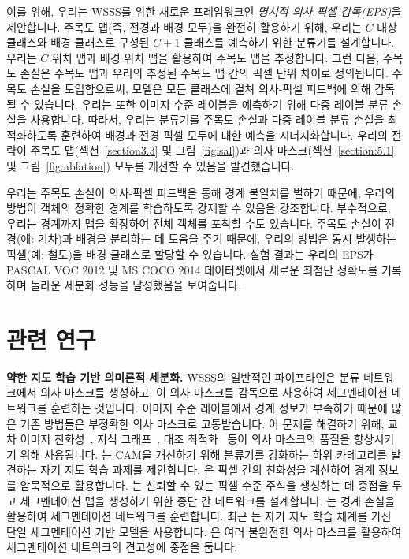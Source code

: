 \documentclass[final]{cvpr}
\begin{document}
이를 위해, 우리는 WSSS를 위한 새로운 프레임워크인 \emph{명시적 의사-픽셀 감독(EPS)}을 제안합니다. 주목도 맵(즉, 전경과 배경 모두)을 완전히 활용하기 위해, 우리는 $C$ 대상 클래스와 배경 클래스로 구성된 $C+1$ 클래스를 예측하기 위한 분류기를 설계합니다. 우리는 $C$ 위치 맵과 배경 위치 맵을 활용하여 주목도 맵을 추정합니다. 그런 다음, 주목도 손실은 주목도 맵과 우리의 추정된 주목도 맵 간의 픽셀 단위 차이로 정의됩니다. 주목도 손실을 도입함으로써, 모델은 모든 클래스에 걸쳐 의사-픽셀 피드백에 의해 감독될 수 있습니다. 우리는 또한 이미지 수준 레이블을 예측하기 위해 다중 레이블 분류 손실을 사용합니다. 따라서, 우리는 분류기를 주목도 손실과 다중 레이블 분류 손실을 최적화하도록 훈련하여 배경과 전경 픽셀 모두에 대한 예측을 시너지화합니다. 우리의 전략이 주목도 맵(섹션~\ref{section3.3} 및 그림~\ref{fig:sal})과 의사 마스크(섹션~\ref{section:5.1} 및 그림~\ref{fig:ablation}) 모두를 개선할 수 있음을 발견했습니다.

우리는 주목도 손실이 의사-픽셀 피드백을 통해 경계 불일치를 벌하기 때문에, 우리의 방법이 객체의 정확한 경계를 학습하도록 강제할 수 있음을 강조합니다. 부수적으로, 우리는 경계까지 맵을 확장하여 전체 객체를 포착할 수도 있습니다. 주목도 손실이 전경(예: 기차)과 배경을 분리하는 데 도움을 주기 때문에, 우리의 방법은 동시 발생하는 픽셀(예: 철도)을 배경 클래스로 할당할 수 있습니다. 실험 결과는 우리의 EPS가 PASCAL VOC 2012 및 MS COCO 2014 데이터셋에서 새로운 최첨단 정확도를 기록하며 놀라운 세분화 성능을 달성했음을 보여줍니다.

\section{관련 연구}

\noindent\textbf{약한 지도 학습 기반 의미론적 세분화.}
WSSS의 일반적인 파이프라인은 분류 네트워크에서 의사 마스크를 생성하고, 이 의사 마스크를 감독으로 사용하여 세그멘테이션 네트워크를 훈련하는 것입니다. 이미지 수준 레이블에서 경계 정보가 부족하기 때문에 많은 기존 방법들은 부정확한 의사 마스크로 고통받습니다. 이 문제를 해결하기 위해, 교차 이미지 친화성~\cite{fan2020cian}, 지식 그래프~\cite{liu2020leveraging}, 대조 최적화~\cite{sun2020mining, zhang2020splitting} 등이 의사 마스크의 품질을 향상시키기 위해 사용됩니다. \cite{chang2020weakly}는 CAM을 개선하기 위해 분류기를 강화하는 하위 카테고리를 발견하는 자기 지도 학습 과제를 제안합니다. \cite{ahn2019weakly, ahn2018learning}은 픽셀 간의 친화성을 계산하여 경계 정보를 암묵적으로 활용합니다. \cite{zhang2020reliability}는 신뢰할 수 있는 픽셀 수준 주석을 생성하는 데 중점을 두고 세그멘테이션 맵을 생성하기 위한 종단 간 네트워크를 설계합니다. \cite{huang2018weakly, kolesnikov2016seed}는 경계 손실을 활용하여 세그멘테이션 네트워크를 훈련합니다. 최근 \cite{araslanov2020single}는 자기 지도 학습 체계를 가진 단일 세그멘테이션 기반 모델을 사용합니다. \cite{fan2020employing}은 여러 불완전한 의사 마스크를 활용하여 세그멘테이션 네트워크의 견고성에 중점을 둡니다.
\end{document}
